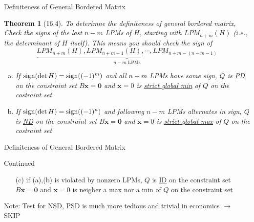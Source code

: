\documentclass[final]{beamer}
\newtheorem{thm}{Theorem}
\newcommand{\bd}{\mathbf}
\begin{document}
\begin{frame}[t]{Definiteness of General Bordered Matrix}
	\begin{thm}
		[16.4] To deterimne the definiteness of general bordered matrix, Check the signs of the last $n-m$ LPMs of $H$, starting with $LPM_{n+m}(H)$ ($i.e.,$ the determinant of $H$ itself). This means you should check the sign of \[
			\underbrace{LPM_{n+m}(H), LPM_{n+m-1}(H), \cdots,LPM_{n+m-(n-m-1)}}_{n-m\text{ LPMs}}
		\]
		\begin{enumerate}[(a)]
			\item If ${\rm sign}(\det H)={\rm sign}((-1)^m)$ and all $n-m$ LPMs have same sign, $Q$ is \uline{PD} on the constraint set $B\bd{x}=\bd{0}$ and $\bd{x}=0$ is \uline{strict global min} of $Q$ on the costraint set
			\item If ${\rm sign}(\det H)={\rm sign}((-1)^n)$ and following $n-m$ LPMs alternates in sign, $Q$ is \uline{ND} on the constraint set $B\bd{x}=\bd{0}$ and $\bd{x}=0$ is \uline{strict global max} of $Q$ on the costraint set
		\end{enumerate}
	\end{thm}
\end{frame}

\begin{frame}[t]{Definiteness of General Bordered Matrix}
	\begin{block}
		{Continued}
		\begin{enumerate}[(a)]
			\item [(c)] if (a),(b) is violated by nonzero LPMs, $Q$ is \uline{ID} on the constraint set $B\bd{x}=\bd{0}$ and $\bd{x}=0$ is neigher a max nor a min of $Q$ on the constraint set
		\end{enumerate}
	\end{block}
	Note: Test for NSD, PSD is much more tedious and trivial in economics $\rightarrow$ SKIP
\end{frame}
\end{document}
